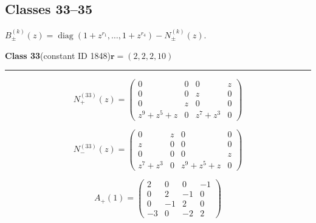 \subsection*{Classes 33--35}
\noindent $B_\pm^{(k)}(z)=\operatorname{diag}(1+z^{r_1},\ldots,1+z^{r_4})-N_\pm^{(k)}(z)$.\par\medskip
\noindent\begin{minipage}{\linewidth}
\noindent\textbf{Class 33}\quad\small (constant ID 1848)\hfill $\symbf{r}=(2,2,2,10)$
\par\smallskip\noindent\textcolor{rulegray}{\rule{\linewidth}{0.3pt}}
\begin{minipage}[c]{0.495\linewidth}\centering\fontsize{9.7}{12}\selectfont
\setlength{\abovedisplayskip}{4pt}\setlength{\belowdisplayskip}{4pt}
\setlength{\abovedisplayshortskip}{4pt}\setlength{\belowdisplayshortskip}{4pt}
\setlength{\arraycolsep}{3pt}\renewcommand{\arraystretch}{1.08}
\[N_{+}^{(33)}(z)=\begin{pmatrix}0 & 0 & 0 & z\\0 & 0 & z & 0\\0 & z & 0 & 0\\z^{9} + z^{5} + z & 0 & z^{7} + z^{3} & 0\end{pmatrix}\]
\end{minipage}%
\begin{minipage}[c]{0.495\linewidth}\centering\fontsize{9.7}{12}\selectfont
\setlength{\abovedisplayskip}{4pt}\setlength{\belowdisplayskip}{4pt}
\setlength{\abovedisplayshortskip}{4pt}\setlength{\belowdisplayshortskip}{4pt}
\setlength{\arraycolsep}{3pt}\renewcommand{\arraystretch}{1.08}
\[N_{-}^{(33)}(z)=\begin{pmatrix}0 & z & 0 & 0\\z & 0 & 0 & 0\\0 & 0 & 0 & z\\z^{7} + z^{3} & 0 & z^{9} + z^{5} + z & 0\end{pmatrix}\]
\end{minipage}%
\par\noindent
\begin{minipage}[c]{0.495\linewidth}\centering\fontsize{9.7}{12}\selectfont
\setlength{\abovedisplayskip}{4pt}\setlength{\belowdisplayskip}{4pt}
\setlength{\abovedisplayshortskip}{4pt}\setlength{\belowdisplayshortskip}{4pt}
\setlength{\arraycolsep}{3pt}\renewcommand{\arraystretch}{1.08}
\[A_{+}(1)=\begin{pmatrix}2 & 0 & 0 & -1\\0 & 2 & -1 & 0\\0 & -1 & 2 & 0\\-3 & 0 & -2 & 2\end{pmatrix}\]

\end{minipage}
\end{minipage}
